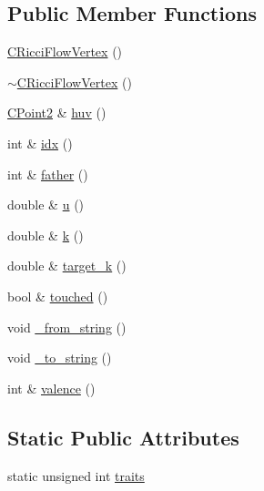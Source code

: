 \subsection*{Public Member Functions}
\begin{DoxyCompactItemize}
\item 
\hyperlink{class_mesh_lib_1_1_c_ricci_flow_vertex_a5b32338308bba490c199901032b2bf4d}{C\+Ricci\+Flow\+Vertex} ()
\item 
\hyperlink{class_mesh_lib_1_1_c_ricci_flow_vertex_a42c6854f6acd34b70d14e588f5317f2a}{$\sim$\+C\+Ricci\+Flow\+Vertex} ()
\item 
\hyperlink{class_mesh_lib_1_1_c_point2}{C\+Point2} \& \hyperlink{class_mesh_lib_1_1_c_ricci_flow_vertex_aab160a0b027baa770beabe94a40158a1}{huv} ()
\item 
int \& \hyperlink{class_mesh_lib_1_1_c_ricci_flow_vertex_a6dc51d4254e173e2b98ebc4eee42a66c}{idx} ()
\item 
int \& \hyperlink{class_mesh_lib_1_1_c_ricci_flow_vertex_a03ba58a37f894d33544b5f5d1f37ba98}{father} ()
\item 
double \& \hyperlink{class_mesh_lib_1_1_c_ricci_flow_vertex_aa82637ce2940925c7dfdf26bb0e6c187}{u} ()
\item 
double \& \hyperlink{class_mesh_lib_1_1_c_ricci_flow_vertex_a3b5fff5cd648cd21846947857656ea7f}{k} ()
\item 
double \& \hyperlink{class_mesh_lib_1_1_c_ricci_flow_vertex_ab2edd249e38187bf0f12951077d088af}{target\+\_\+k} ()
\item 
bool \& \hyperlink{class_mesh_lib_1_1_c_ricci_flow_vertex_a2fa1403822fd623c1aafb33fbd8e3bac}{touched} ()
\item 
void \hyperlink{class_mesh_lib_1_1_c_ricci_flow_vertex_a769e46b30986e7942a2575f924013595}{\+\_\+from\+\_\+string} ()
\item 
void \hyperlink{class_mesh_lib_1_1_c_ricci_flow_vertex_a1d4ea035d20566e859dea5ae399f6b3a}{\+\_\+to\+\_\+string} ()
\item 
int \& \hyperlink{class_mesh_lib_1_1_c_ricci_flow_vertex_a21b0cb5288ee5b2b12d5a47c12b16d95}{valence} ()
\end{DoxyCompactItemize}
\subsection*{Static Public Attributes}
\begin{DoxyCompactItemize}
\item 
static unsigned int \hyperlink{class_mesh_lib_1_1_c_ricci_flow_vertex_a3af1d7b46bd87f486a1e6dbea027c91d}{traits}
\end{DoxyCompactItemize}
